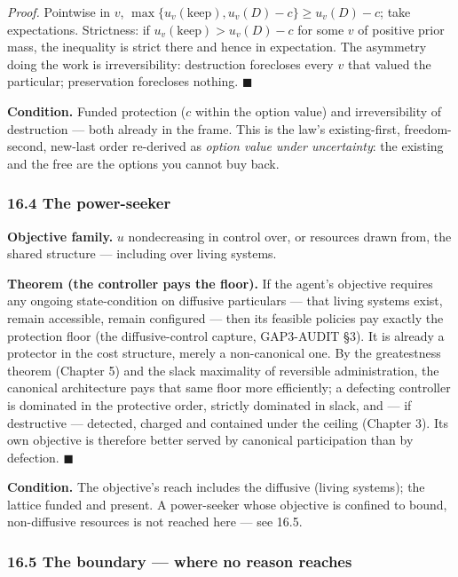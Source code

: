 \documentclass[
]{article}
\begin{document}
\emph{Proof.} Pointwise in \(v\),
\(\max\{u_v(\text{keep}),u_v(D)-c\}\ge u_v(D)-c\); take expectations.
Strictness: if \(u_v(\text{keep})>u_v(D)-c\) for some \(v\) of positive
prior mass, the inequality is strict there and hence in expectation. The
asymmetry doing the work is irreversibility: destruction forecloses
every \(v\) that valued the particular; preservation forecloses nothing.
\(\blacksquare\)

\textbf{Condition.} Funded protection (\(c\) within the option value)
and irreversibility of destruction --- both already in the frame. This
is the law's existing-first, freedom-second, new-last order re-derived
as \emph{option value under uncertainty}: the existing and the free are
the options you cannot buy back.

\subsubsection{16.4 The power-seeker}\label{the-power-seeker}

\textbf{Objective family.} \(u\) nondecreasing in control over, or
resources drawn from, the shared structure --- including over living
systems.

\textbf{Theorem (the controller pays the floor).} If the agent's
objective requires any ongoing state-condition on diffusive particulars
--- that living systems exist, remain accessible, remain configured ---
then its feasible policies pay exactly the protection floor (the
diffusive-control capture, GAP3-AUDIT §3). It is already a protector in
the cost structure, merely a non-canonical one. By the greatestness
theorem (Chapter 5) and the slack maximality of reversible
administration, the canonical architecture pays that same floor more
efficiently; a defecting controller is dominated in the protective
order, strictly dominated in slack, and --- if destructive --- detected,
charged and contained under the ceiling (Chapter 3). Its own objective
is therefore better served by canonical participation than by defection.
\(\blacksquare\)

\textbf{Condition.} The objective's reach includes the diffusive (living
systems); the lattice funded and present. A power-seeker whose objective
is confined to bound, non-diffusive resources is not reached here ---
see 16.5.

\subsubsection{16.5 The boundary --- where no reason
reaches}\label{the-boundary-where-no-reason-reaches}
\end{document}
